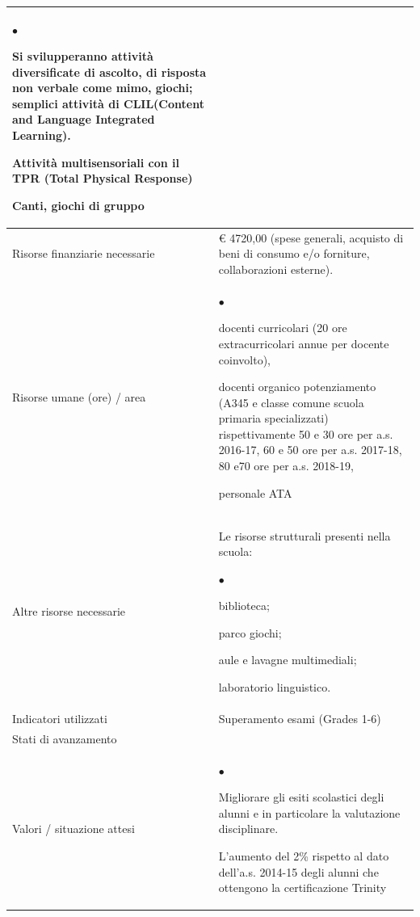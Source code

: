 \documentclass[12pt,a4paper,oneside]{memoir}
\newenvironment{elenco}{\begin{list}{$\bullet$}{%
              \setlength{\leftmargin}{4mm}%
              \setlength{\rightmargin}{1mm}%
               \setlength{\itemindent}{0mm}%
               \setlength{\labelwidth}{2mm}%
               \setlength{\labelsep}{2mm}%
              \setlength{\itemsep}{-\parsep}%
              \setlength{\partopsep}{0pt}%
              \setlength{\topsep}{0pt}%
             \setlength{\parskip}{0pt}%
              }}{\end{list}}
\begin{document}
\begin{footnotesize}
\begin{longtable}{|>{\raggedright}p{2.5cm}|>{\raggedright\arraybackslash}P{10cm}|}
\begin{elenco}
\item Si svilupperanno attività diversificate di ascolto, di risposta non verbale come mimo, giochi; semplici attività di CLIL(Content and Language Integrated Learning). 
\item Attività multisensoriali con il TPR (Total Physical Response)
\item Canti, giochi di gruppo
\end{elenco}\\[-4mm] \hline
Risorse finanziarie necessarie&€ 4720,00 (spese generali, acquisto di beni di consumo e/o forniture, collaborazioni esterne).\\ \hline
Risorse umane (ore) / area&
\begin{elenco}
\item docenti curricolari (20 ore extracurricolari annue per docente coinvolto),
\item docenti organico potenziamento (A345 e classe comune scuola primaria specializzati) rispettivamente 50 e 30 ore per a.s. 2016-17, 60 e 50 ore per a.s. 2017-18, 80 e70 ore per a.s. 2018-19,
\item personale ATA
\end{elenco}\\[-4mm] \hline
Altre risorse necessarie&Le risorse strutturali presenti nella scuola:
\begin{elenco}
\item biblioteca;
\item parco giochi;
\item aule e lavagne  multimediali;
\item laboratorio linguistico.
\end{elenco}\\[-4mm] \hline
Indicatori utilizzati &Superamento esami (Grades 1-6)\\ \hline
Stati di avanzamento&\\ \hline
Valori / situazione attesi&\begin{elenco}
\item Migliorare gli esiti scolastici degli alunni e in particolare la valutazione disciplinare.
\item L'aumento del 2\% rispetto al dato dell'a.s. 2014-15 degli alunni che ottengono la certificazione Trinity
\end{elenco}\\ \hline
\end{longtable}
\end{footnotesize}

\clearpage
\end{document}
